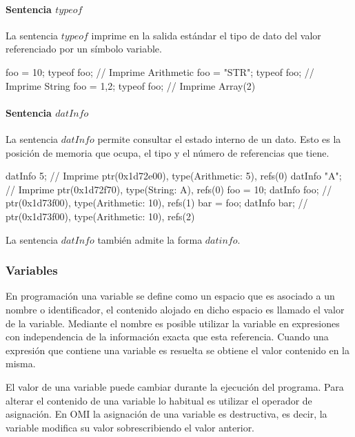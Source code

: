 \paragraph{Sentencia $typeof$} \label{sec:stmt_typeof}
La sentencia $typeof$ imprime en la salida estándar el tipo de dato del valor 
referenciado por un símbolo variable. \\

\begin{myverbatim}
   foo = 10;
   typeof foo; // Imprime Arithmetic
   foo = "STR";
   typeof foo; // Imprime String
   foo = {1,2};
   typeof foo; // Imprime Array(2)
\end{myverbatim}


\paragraph{Sentencia $datInfo$} \label{sec:stmt_datInfo}
La sentencia $datInfo$ permite consultar el estado interno de un dato. Esto
es la posición de memoria que ocupa, el tipo y el número de referencias que tiene. \\

\begin{myverbatim}
   datInfo 5; // Imprime ptr(0x1d72e00), type(Arithmetic: 5), refs(0)
   datInfo "A"; // Imprime ptr(0x1d72f70), type(String: A), refs(0)
   foo = 10;
   datInfo foo; // ptr(0x1d73f00), type(Arithmetic: 10), refs(1)
   bar = foo;
   datInfo bar; // ptr(0x1d73f00), type(Arithmetic: 10), refs(2)
\end{myverbatim}

La sentencia $datInfo$ también admite la forma $datinfo$.

\subsubsection{Variables}
En programación una variable se define como un espacio que es asociado a un nombre o identificador, el contenido alojado en dicho espacio es llamado el valor de la variable.
Mediante el nombre es posible utilizar la variable en expresiones con independencia de la información exacta que esta referencia. Cuando una expresión que contiene una variable es resuelta
se obtiene el valor contenido en la misma. 

El valor de una variable puede cambiar durante la ejecución del programa. Para alterar el contenido de una variable lo habitual es utilizar el operador de asignación. 
En OMI la asignación de una variable es destructiva, es decir, la variable modifica su valor sobrescribiendo el valor anterior. 

